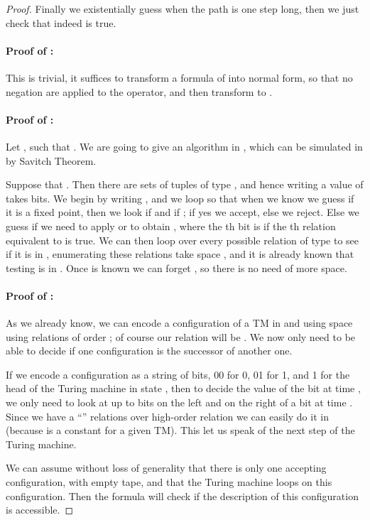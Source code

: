 \documentclass[a4paper,12pt]{article}
\theoremstyle{definition}
\begin{document}
\begin{proof}
Finally we existentially guess when the path is one step long, then we
just check that indeed  is true.
\paragraph{Proof of :} This is trivial,
it suffices to transform a formula of  into normal form,
so that no negation are applied to the operator, and then transform
 to .

\paragraph{Proof of  :}
Let , such that . We are going to give an algorithm in
, which can be simulated in
 by Savitch Theorem.

Suppose that . Then there are
 sets of tuples of type , and hence
writing a value of  takes  bits. We
begin by writing , and we loop so that when we know
 we guess if it is a fixed point, then we look if
 and if ; if yes we
accept, else we reject. Else we guess if we need to apply  or
 to obtain , where the th bit is  if the th
relation equivalent to  is true. We can then loop over every
possible relation of type  to see if it is in ,
enumerating these relations take space ,
and it is already known that testing  is in
. Once  is known we can
forget , so there is no need of more space.

\paragraph{Proof of :}
As we already know, we can encode a configuration of a TM in
 and using space
 using relations of order ; of course
our relation will be . We now only need to be able to decide if one
configuration is the successor of another one.

If we encode a configuration as a string of bits, 00 for 0, 01 for 1,
and 1 for the head of the Turing machine in state , then to
decide the value of the bit  at time , we only need to look at
up to  bits on the left and on the right of a bit at time
. Since we have a ``'' relations over high-order relation we can
easily do it in  (because  is a constant for a given
TM). This let us speak of the next step of the Turing machine.



We can assume without loss of generality that there is only one
accepting configuration, with empty tape, and that the Turing machine
loops on this configuration. Then the formula will check if the
description of this configuration is accessible.
\end{proof}
\end{document}
